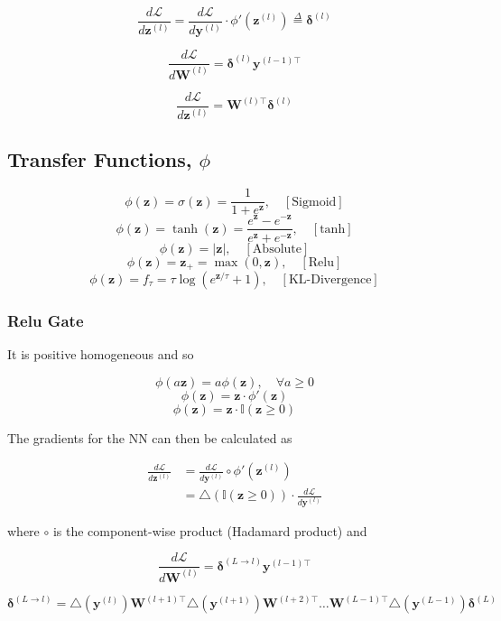 \documentclass[10pt]{article}
\theoremstyle{definition}
\begin{document}
\begin{equation*}
\frac{d\mathcal{L}}{d\mathbf{z}^{(l)}} = \frac{d\mathcal{L}}{d\mathbf{y}^{(l)}} \cdot \phi'(\mathbf{z}^{(l)}) \overset{\Delta}{=} \pmb{\delta}^{(l)}
\end{equation*}

\begin{equation*}
\frac{d\mathcal{L}}{d\mathbf{W}^{(l)}} = \pmb{\delta}^{(l)}\mathbf{y}^{(l-1)\top}
\end{equation*}

\begin{equation*}
\frac{d\mathcal{L}}{d\mathbf{z}^{(l)}} = \mathbf{W}^{(l)\top} \pmb{\delta}^{(l)}
\end{equation*}

\subsection*{Transfer Functions, $\phi$}

$$
\phi(\mathbf{z}) = \sigma(\mathbf{z}) = \frac{1}{1 + e^{\mathbf{z}}}, \quad [\text{Sigmoid}]
$$
$$
\phi(\mathbf{z}) = \tanh(\mathbf{z}) = \frac{e^{\mathbf{z}} - e^{-\mathbf{z}}}{e^{\mathbf{z}} + e^{-\mathbf{z}}}, \quad [\text{tanh}]
$$
$$
\phi(\mathbf{z}) = \lvert\mathbf{z}\rvert, \quad [\text{Absolute}]
$$
$$
\phi(\mathbf{z}) = \mathbf{z}_{+} = \max(0,\mathbf{z}), \quad [\text{Relu}]
$$
$$
\phi(\mathbf{z}) = f_{\tau} = \tau\log(e^{\mathbf{z}/\tau} + 1), \quad [\text{KL-Divergence}]
$$

\subsubsection*{Relu Gate}

It is positive homogeneous and so

$$
\phi(a\mathbf{z}) = a\phi(\mathbf{z}), \quad \forall a \geq 0
$$
$$
\phi(\mathbf{z}) = \mathbf{z}\cdot\phi'(\mathbf{z})
$$
$$
\phi(\mathbf{z}) = \mathbf{z}\cdot\mathbb{I}(\mathbf{z}\geq0)
$$

\noindent
The gradients for the NN can then be calculated as

\begin{equation*}
\begin{aligned}
\frac{d\mathcal{L}}{d\mathbf{z}^{(l)}} & = \frac{d\mathcal{L}}{d\mathbf{y}^{(l)}}\circ\phi'(\mathbf{z}^{(l)}) \\
& = \triangle(\mathbb{I}(\mathbf{z}\geq0))\cdot\frac{d\mathcal{L}}{d\mathbf{y}^{(l)}}
\end{aligned}
\end{equation*}

\noindent
where $\circ$ is the component-wise product (Hadamard product) and

\begin{equation*}
\frac{d\mathcal{L}}{d\mathbf{W}^{(l)}} = \pmb{\delta}^{(L\rightarrow l)}\mathbf{y}^{(l-1)\top}
\end{equation*}

\begin{equation*}
\pmb{\delta}^{(L\rightarrow l)} = \triangle(\mathbf{y}^{(l)})\mathbf{W}^{(l+1)\top}\triangle(\mathbf{y}^{(l+1)})\mathbf{W}^{(l+2)\top}\hdots\mathbf{W}^{(L-1)\top}\triangle(\mathbf{y}^{(L-1)})\pmb{\delta}^{(L)}
\end{equation*}
\end{document}
